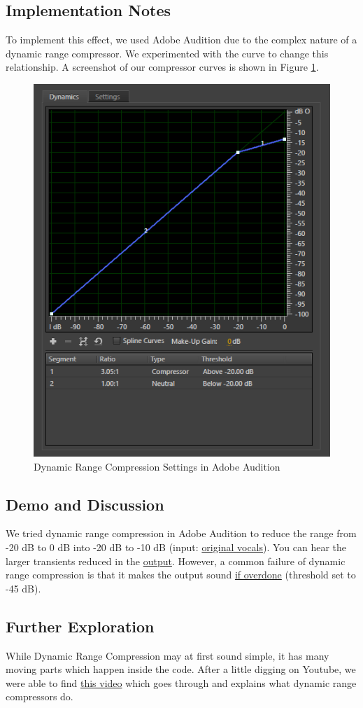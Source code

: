 \subsection{Implementation Notes}
To implement this effect, we used Adobe Audition due to the complex nature of a dynamic range compressor. We experimented with the curve to change this relationship. A screenshot of our compressor curves is shown in Figure \ref{fig:drc-audition}.
\begin{figure}[ht]
    \centering
    \includegraphics[scale=0.6]{drc.PNG}
    \caption{Dynamic Range Compression Settings in Adobe Audition}
    \label{fig:drc-audition}
\end{figure}

\subsection{Demo and Discussion}
We tried dynamic range compression in Adobe Audition to reduce the range from -20 dB to 0 dB into -20 dB to -10 dB (input: \href{run:../InputAudio/22-001 Original Vocal.wav}{original vocals}). You can hear the larger transients reduced in the \href{run:../OutputAudio/drc_normal.wav}{output}. However, a common failure of dynamic range compression is that it makes the output sound \href{run:../OutputAudio/drc_extreme.wav}{if overdone} (threshold set to -45 dB).

\subsection{Further Exploration}
While Dynamic Range Compression may at first sound simple, it has many moving parts which happen inside the code. After a little digging on Youtube, we were able to find \href{https://www.youtube.com/watch?v=dd4ujGjlX1k}{this video} which goes through and explains what dynamic range compressors do.